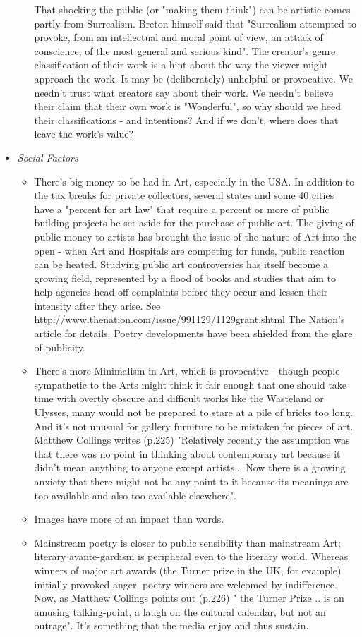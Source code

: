\documentclass[11pt]{article}
\begin{document}
\begin{itemize}
\begin{itemize}
That shocking the public (or "making them think") can be artistic
comes partly from Surrealism. Breton himself said that 
"Surrealism attempted to provoke, from an intellectual and moral point of 
view, an attack of conscience, of the most general and serious kind". 
The creator's genre classification of their work is a hint
  about the way the viewer might approach the work. It may be (deliberately) unhelpful or provocative. We needn't 
trust what creators say about their work. 
  We needn't believe their claim that their own work is
  "Wonderful", so why should we heed their classifications - and intentions? 
And if we don't, where does that leave the work's value?
\end{itemize}
\item \textit{Social Factors}
\begin{itemize}
\item  There's big money to be had in Art, especially in the USA. In addition
to the tax breaks for private collectors, several
states and some 40 cities have a "percent for
art law" that require a percent or more of public building
projects be set aside for the purchase of public art. The giving of
public money to artists has brought the issue of the nature of Art into
the open - when Art and Hospitals are competing for funds, public reaction
can be heated. 
Studying public art controversies has itself become a growing field,
represented by a flood of books and studies that aim to help agencies
head off complaints before they occur and lessen their intensity after
they arise. See \url{http://www.thenation.com/issue/991129/1129grant.shtml}
The Nation's article for details. Poetry developments have been
shielded from the glare of publicity.
\item  There's more Minimalism in Art, which is provocative - though people sympathetic 
to the Arts might 
  think it fair enough that one should take time with overtly obscure and
difficult works like the Wasteland or Ulysses, 
  many would not be prepared to stare at a pile of bricks too long.
  And it's not unusual for gallery furniture to be mistaken for pieces of
  art. Matthew Collings writes (p.225) "Relatively recently the assumption was that there was no point  in
thinking about contemporary art because it didn't mean anything to
anyone except artists... Now there is a growing anxiety that there might
not be any point to it because its meanings are too available and also
too available elsewhere".
\item Images have more of an impact than words.
\item Mainstream poetry is closer to public sensibility than mainstream Art;
literary avante-gardism is peripheral even to the literary world.
Whereas winners of major art awards (the Turner prize in the UK, for example)
initially provoked anger, poetry winners are welcomed by indifference.
Now, as Matthew Collings points out (p.226) " the Turner Prize .. is an 
amusing talking-point, a laugh on the cultural calendar, but not an outrage".
It's something that the media enjoy and thus sustain. 
\end{itemize}

\end{itemize} 
\end{document}
